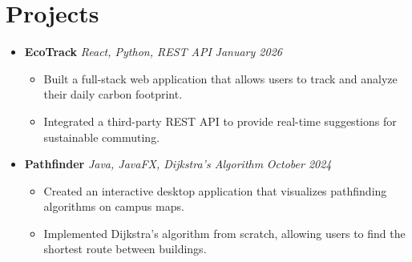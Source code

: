 \documentclass[letterpaper,11pt]{article}
\begin{document}
\section{Projects}
  \begin{itemize}[leftmargin=*]
    \item[]
      \textbf{EcoTrack} \textbar{} \small{\textit{React, Python, REST API}} \hfill \textit{January 2026}
      \begin{itemize}
        \item Built a full-stack web application that allows users to track and analyze their daily carbon footprint.
        \item Integrated a third-party REST API to provide real-time suggestions for sustainable commuting.
      \end{itemize}
      
    \item[]
      \textbf{Pathfinder} \textbar{} \small{\textit{Java, JavaFX, Dijkstra's Algorithm}} \hfill \textit{October 2024}
      \begin{itemize}
        \item Created an interactive desktop application that visualizes pathfinding algorithms on campus maps.
        \item Implemented Dijkstra's algorithm from scratch, allowing users to find the shortest route between buildings.
      \end{itemize}
  \end{itemize}
\end{document}
